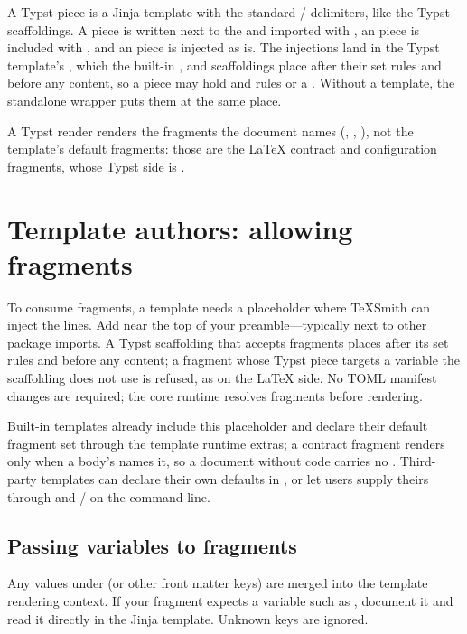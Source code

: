 \documentclass[a4paper,twoside]{article}
\begin{document}
A Typst piece is a Jinja template with the standard \tscodeinline{\{\{ \}\}} / \tscodeinline{\{\% \%\}}
delimiters, like the Typst scaffoldings. A  piece is written next to
the  and imported with , an  piece is
included with , and an  piece is injected as is. The
injections land in the Typst template's , which the
built-in ,  and  scaffoldings place after their set
rules and before any content, so a piece may hold  and  rules or
a . Without a template, the standalone wrapper puts
them at the same place.

A Typst render renders the fragments the document names (,
, ), not the template's default fragments: those are the \LaTeX{}
contract and configuration fragments, whose Typst side is .
\section{Template authors: allowing fragments}
To consume fragments, a template needs a placeholder where TeXSmith can inject
the  lines. Add  near the top of your
preamble---typically next to other package imports. A Typst scaffolding that
accepts fragments places  after its set rules and before
any content; a fragment whose Typst piece targets a variable the scaffolding
does not use is refused, as on the \LaTeX{} side. No TOML manifest changes are
required; the core runtime resolves fragments before rendering.

Built-in templates already include this placeholder and declare their default
fragment set through the template runtime extras; a contract fragment renders
only when a body's  names it, so a document without code
carries no . Third-party templates can declare their own defaults
in , or let users supply theirs through
 and  /  on the command line.
\subsection{Passing variables to fragments}
Any values under  (or other front matter keys) are merged into the
template rendering context. If your fragment expects a variable such as
, document it and read it directly in the Jinja template. Unknown
keys are ignored.
\end{document}
